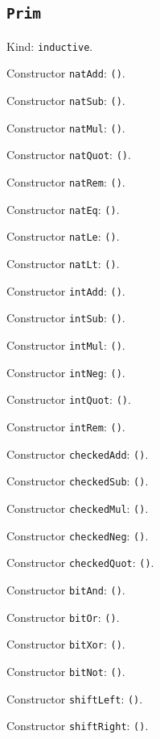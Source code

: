 \documentclass[11pt]{article}
\begin{document}
\subsection*{\texttt{Prim}}
\noindent Kind: \texttt{inductive}.\par
\noindent Constructor \texttt{natAdd}: \texttt{()}.\par
\noindent Constructor \texttt{natSub}: \texttt{()}.\par
\noindent Constructor \texttt{natMul}: \texttt{()}.\par
\noindent Constructor \texttt{natQuot}: \texttt{()}.\par
\noindent Constructor \texttt{natRem}: \texttt{()}.\par
\noindent Constructor \texttt{natEq}: \texttt{()}.\par
\noindent Constructor \texttt{natLe}: \texttt{()}.\par
\noindent Constructor \texttt{natLt}: \texttt{()}.\par
\noindent Constructor \texttt{intAdd}: \texttt{()}.\par
\noindent Constructor \texttt{intSub}: \texttt{()}.\par
\noindent Constructor \texttt{intMul}: \texttt{()}.\par
\noindent Constructor \texttt{intNeg}: \texttt{()}.\par
\noindent Constructor \texttt{intQuot}: \texttt{()}.\par
\noindent Constructor \texttt{intRem}: \texttt{()}.\par
\noindent Constructor \texttt{checkedAdd}: \texttt{()}.\par
\noindent Constructor \texttt{checkedSub}: \texttt{()}.\par
\noindent Constructor \texttt{checkedMul}: \texttt{()}.\par
\noindent Constructor \texttt{checkedNeg}: \texttt{()}.\par
\noindent Constructor \texttt{checkedQuot}: \texttt{()}.\par
\noindent Constructor \texttt{bitAnd}: \texttt{()}.\par
\noindent Constructor \texttt{bitOr}: \texttt{()}.\par
\noindent Constructor \texttt{bitXor}: \texttt{()}.\par
\noindent Constructor \texttt{bitNot}: \texttt{()}.\par
\noindent Constructor \texttt{shiftLeft}: \texttt{()}.\par
\noindent Constructor \texttt{shiftRight}: \texttt{()}.\par
\end{document}
